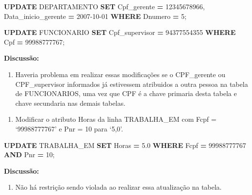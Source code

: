 \documentclass[
]{article}
\newenvironment{Shaded}{\begin{snugshade}}{\end{snugshade}}
\newcommand{\DecValTok}[1]{\textcolor[rgb]{0.00,0.00,0.81}{#1}}
\newcommand{\FloatTok}[1]{\textcolor[rgb]{0.00,0.00,0.81}{#1}}
\newcommand{\KeywordTok}[1]{\textcolor[rgb]{0.13,0.29,0.53}{\textbf{#1}}}
\newcommand{\NormalTok}[1]{#1}
\newcommand{\OperatorTok}[1]{\textcolor[rgb]{0.81,0.36,0.00}{\textbf{#1}}}
\newcommand{\StringTok}[1]{\textcolor[rgb]{0.31,0.60,0.02}{#1}}
\providecommand{\tightlist}{%
  \setlength{\itemsep}{0pt}\setlength{\parskip}{0pt}}
\begin{document}
\begin{Shaded}
\begin{Highlighting}[]

\KeywordTok{UPDATE}\NormalTok{ DEPARTAMENTO}
\KeywordTok{SET}\NormalTok{ Cpf\_gerente }\OperatorTok{=} \StringTok{\textquotesingle{}12345678966\textquotesingle{}}\NormalTok{, Data\_inicio\_gerente }\OperatorTok{=} \StringTok{\textquotesingle{}2007{-}10{-}01\textquotesingle{}}
\KeywordTok{WHERE}\NormalTok{ Dnumero }\OperatorTok{=} \DecValTok{5}\NormalTok{;}

\KeywordTok{UPDATE}\NormalTok{ FUNCIONARIO}
\KeywordTok{SET}\NormalTok{ Cpf\_supervisor }\OperatorTok{=} \StringTok{\textquotesingle{}94377554355\textquotesingle{}}
\KeywordTok{WHERE}\NormalTok{ Cpf }\OperatorTok{=} \StringTok{\textquotesingle{}99988777767\textquotesingle{}}\NormalTok{;}
\end{Highlighting}
\end{Shaded}

\textbf{Discussão:}

\begin{enumerate}
\def\labelenumi{\roman{enumi}.}
\tightlist
\item
  Haveria problema em realizar essas modificações se o CPF\_gerente ou
  CPF\_supervisor informados já estivessem atribuidos a outra pessoa na
  tabela de FUNCIONARIOS, uma vez que CPF é a chave primaria desta
  tabela e chave secundaria nas demais tabelas.
\end{enumerate}

\begin{enumerate}
\def\labelenumi{\arabic{enumi}.}
\setcounter{enumi}{9}
\tightlist
\item
  Modificar o atributo Horas da linha TRABALHA\_EM com Fcpf =
  `99988777767' e Pnr = 10 para `5,0'.
\end{enumerate}

\begin{Shaded}
\begin{Highlighting}[]
\KeywordTok{UPDATE}\NormalTok{ TRABALHA\_EM}
\KeywordTok{SET}\NormalTok{ Horas }\OperatorTok{=} \FloatTok{5.0} 
\KeywordTok{WHERE}\NormalTok{ Fcpf }\OperatorTok{=} \StringTok{\textquotesingle{}99988777767\textquotesingle{}} \KeywordTok{AND}\NormalTok{ Pnr }\OperatorTok{=} \DecValTok{10}\NormalTok{;}
\end{Highlighting}
\end{Shaded}

\textbf{Discussão:}

\begin{enumerate}
\def\labelenumi{\roman{enumi}.}
\tightlist
\item
  Não há restrição sendo violada ao realizar essa atualização na tabela.
\end{enumerate}
\end{document}
